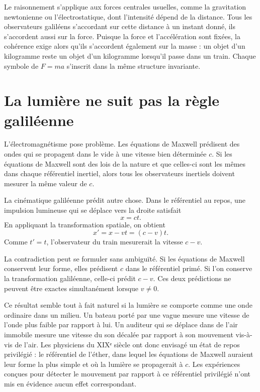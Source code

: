 Le raisonnement s’applique aux forces centrales usuelles, comme la gravitation newtonienne ou l’électrostatique, dont l’intensité dépend de la distance. Tous les observateurs galiléens s’accordant sur cette distance à un instant donné, ils s’accordent aussi sur la force. Puisque la force et l’accélération sont fixées, la cohérence exige alors qu’ils s’accordent également sur la masse : un objet d’un kilogramme reste un objet d’un kilogramme lorsqu’il passe dans un train. Chaque symbole de \(F=ma\) s’inscrit dans la même structure invariante.

\section{La lumière ne suit pas la règle galiléenne}

L’électromagnétisme pose problème. Les équations de Maxwell prédisent des ondes qui se propagent dans le vide à une vitesse bien déterminée \(c\). Si les équations de Maxwell sont des lois de la nature et que celles-ci sont les mêmes dans chaque référentiel inertiel, alors tous les observateurs inertiels doivent mesurer la même valeur de \(c\).

La cinématique galiléenne prédit autre chose. Dans le référentiel au repos, une impulsion lumineuse qui se déplace vers la droite satisfait
\begin{equation}
x=ct.
\end{equation}
En appliquant la transformation spatiale, on obtient
\begin{equation}
x'=x-vt=(c-v)t.
\end{equation}
Comme \(t'=t\), l’observateur du train mesurerait la vitesse \(c-v\).

La contradiction peut se formuler sans ambiguïté. Si les équations de Maxwell conservent leur forme, elles prédisent \(c\) dans le référentiel primé. Si l’on conserve la transformation galiléenne, celle-ci prédit \(c-v\). Ces deux prédictions ne peuvent être exactes simultanément lorsque \(v\ne0\).

Ce résultat semble tout à fait naturel si la lumière se comporte comme une onde ordinaire dans un milieu. Un bateau porté par une vague mesure une vitesse de l’onde plus faible par rapport à lui. Un auditeur qui se déplace dans de l’air immobile mesure une vitesse du son décalée par rapport à son mouvement vis-à-vis de l’air. Les physiciens du XIXᵉ siècle ont donc envisagé un état de repos privilégié : le référentiel de l’éther, dans lequel les équations de Maxwell auraient leur forme la plus simple et où la lumière se propagerait à \(c\). Les expériences conçues pour détecter le mouvement par rapport à ce référentiel privilégié n’ont mis en évidence aucun effet correspondant.

